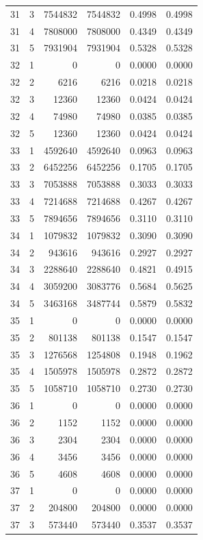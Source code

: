 \begin{longtable}{rrrrrr}
31 & 3 & 7544832 & 7544832 & 0.4998 & 0.4998 \\
31 & 4 & 7808000 & 7808000 & 0.4349 & 0.4349 \\
31 & 5 & 7931904 & 7931904 & 0.5328 & 0.5328 \\
32 & 1 & 0 & 0 & 0.0000 & 0.0000 \\
32 & 2 & 6216 & 6216 & 0.0218 & 0.0218 \\
32 & 3 & 12360 & 12360 & 0.0424 & 0.0424 \\
32 & 4 & 74980 & 74980 & 0.0385 & 0.0385 \\
32 & 5 & 12360 & 12360 & 0.0424 & 0.0424 \\
33 & 1 & 4592640 & 4592640 & 0.0963 & 0.0963 \\
33 & 2 & 6452256 & 6452256 & 0.1705 & 0.1705 \\
33 & 3 & 7053888 & 7053888 & 0.3033 & 0.3033 \\
33 & 4 & 7214688 & 7214688 & 0.4267 & 0.4267 \\
33 & 5 & 7894656 & 7894656 & 0.3110 & 0.3110 \\
34 & 1 & 1079832 & 1079832 & 0.3090 & 0.3090 \\
34 & 2 & 943616 & 943616 & 0.2927 & 0.2927 \\
34 & 3 & 2288640 & 2288640 & 0.4821 & 0.4915 \\
34 & 4 & 3059200 & 3083776 & 0.5684 & 0.5625 \\
34 & 5 & 3463168 & 3487744 & 0.5879 & 0.5832 \\
35 & 1 & 0 & 0 & 0.0000 & 0.0000 \\
35 & 2 & 801138 & 801138 & 0.1547 & 0.1547 \\
35 & 3 & 1276568 & 1254808 & 0.1948 & 0.1962 \\
35 & 4 & 1505978 & 1505978 & 0.2872 & 0.2872 \\
35 & 5 & 1058710 & 1058710 & 0.2730 & 0.2730 \\
36 & 1 & 0 & 0 & 0.0000 & 0.0000 \\
36 & 2 & 1152 & 1152 & 0.0000 & 0.0000 \\
36 & 3 & 2304 & 2304 & 0.0000 & 0.0000 \\
36 & 4 & 3456 & 3456 & 0.0000 & 0.0000 \\
36 & 5 & 4608 & 4608 & 0.0000 & 0.0000 \\
37 & 1 & 0 & 0 & 0.0000 & 0.0000 \\
37 & 2 & 204800 & 204800 & 0.0000 & 0.0000 \\
37 & 3 & 573440 & 573440 & 0.3537 & 0.3537 \\

\end{longtable}
